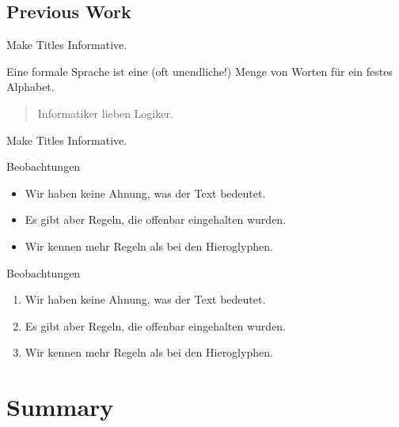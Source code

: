 \documentclass[xetex,12pt,aspectratio=169]{beamer}
\begin{document}
\subsection{Previous Work}

\begin{frame}{Make Titles Informative.}
\begin{figure}\centering
\end{figure}
\begin{definition}
  Eine \alert{formale Sprache} ist eine (oft unendliche!) Menge von Worten für ein festes Alphabet.
\end{definition}
\begin{quotation}
  Informatiker lieben Logiker.
\end{quotation}
\end{frame}

\begin{frame}{Make Titles Informative.}
\begin{block}{Beobachtungen}
  \begin{itemize}
    \item Wir haben keine Ahnung, was der Text bedeutet.
    \item Es gibt aber \alert{Regeln}, die offenbar eingehalten wurden.
    \item Wir kennen mehr Regeln als bei den Hieroglyphen.
  \end{itemize}
\end{block}
\begin{block}{Beobachtungen}
  \begin{enumerate}
    \item Wir haben keine Ahnung, was der Text bedeutet.
    \item Es gibt aber \alert{Regeln}, die offenbar eingehalten wurden.
    \item Wir kennen mehr Regeln als bei den Hieroglyphen.
  \end{enumerate}
\end{block}
\end{frame}

\section*{Summary}
\end{document}
